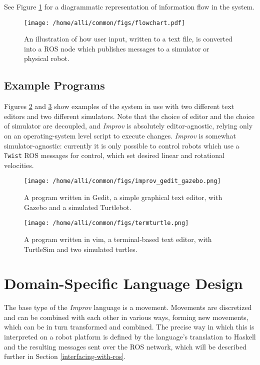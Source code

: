 \documentclass[sigconf]{acmart}
\begin{document}
See Figure \ref{flowchart} for a diagrammatic representation of
information flow in the system.



\begin{figure}[h]
\centering
\texttt{[image: /home/alli/common/figs/flowchart.pdf]}
\caption{An illustration of how user input, written to a text file, is
converted into a ROS node which publishes messages to a simulator or physical 
robot.
\label{flowchart}}
\end{figure}



\subsection{Example Programs}\label{example-programs}

Figures \ref{gedit} and \ref{vim} show examples of the system in use with two
different text editors and two different simulators. Note that the choice of
editor and the choice of simulator are decoupled, and \emph{Improv} is
absolutely editor-agnostic, relying only on an operating-system level script
to execute changes. \emph{Improv} is somewhat simulator-agnostic: 
currently it is only possible to control robots which use a \texttt{Twist} ROS messages
for control, which set desired linear and rotational
velocities.

\begin{figure}[h]
\centering
\texttt{[image: /home/alli/common/figs/improv\_gedit\_gazebo.png]}
\caption{A program written in Gedit, a simple graphical text editor, with Gazebo and a simulated
Turtlebot.\label{gedit}}
\end{figure}

\begin{figure}[h]
\centering
\texttt{[image: /home/alli/common/figs/termturtle.png]}
\caption{A program written in vim, a terminal-based text editor, with TurtleSim and two
simulated turtles.\label{vim}}
\end{figure}



\section{Domain-Specific Language
Design}\label{domain-specific-language-design}


The base type of the \emph{Improv} language is a movement. Movements are
discretized and can be combined with each other in various ways, forming new
movements, which can be in turn transformed and combined. The precise way in
which this is interpreted on a robot platform is defined by the language's
translation to Haskell and the resulting messages sent over the ROS network,
which will be described further in Section \ref{interfacing-with-ros}.
\end{document}
